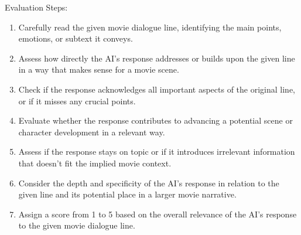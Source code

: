\documentclass[stu,donotrepeattitle,floatsintext]{apa7}
\begin{document}
\begin{appendices}
        \bigskip
        \noindent Evaluation Steps:
        \begin{enumerate}
            \item Carefully read the given movie dialogue line, identifying the main points, emotions, or subtext it conveys.
            \item Assess how directly the AI's response addresses or builds upon the given line in a way that makes sense for a movie scene.
            \item Check if the response acknowledges all important aspects of the original line, or if it misses any crucial points.
            \item Evaluate whether the response contributes to advancing a potential scene or character development in a relevant way.
            \item Assess if the response stays on topic or if it introduces irrelevant information that doesn't fit the implied movie context.
            \item Consider the depth and specificity of the AI's response in relation to the given line and its potential place in a larger movie narrative.
            \item Assign a score from 1 to 5 based on the overall relevance of the AI's response to the given movie dialogue line.
        \end{enumerate}

    \end{appendices}
\end{document}
